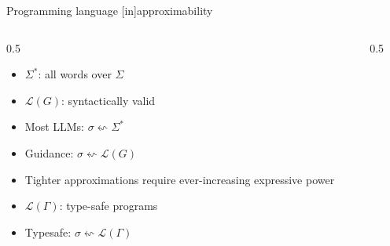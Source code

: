 \documentclass{beamer}
\begin{document}
\begin{frame}{Programming language [in]approximability}
  \begin{columns}[T,onlytextwidth]
    \hspace{-0.5cm}\begin{column}{0.5\textwidth}
         \begin{itemize}
           \item<1-> $\Sigma^*$: all words over $\Sigma$
           \item<2-> $\mathcal{L}(G)$: syntactically valid
           \item<3-> Most LLMs: $\sigma \leftsquigarrow \Sigma^*$
           \item<4-> Guidance: $\sigma \leftsquigarrow \mathcal{L}(G)$
           \item<6-> Tighter approximations require ever-increasing expressive power
           \item<7-> $\mathcal{L}(\Gamma)$: type-safe programs
           \item<8-> Typesafe: $\sigma \leftsquigarrow \mathcal{L}(\Gamma)$
         \end{itemize}
    \end{column}

    \begin{column}{0.5\textwidth}
      \centering
      \hspace{-0.3cm}
\end{column}
\end{columns}
\end{frame}
\end{document}
